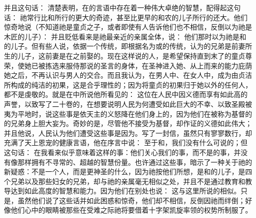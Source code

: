 并且这句话： 清楚表明，在的言语中存在着一种伟大卓绝的智慧，配得起这句话： 祂常行比和所行的更大的奇迹，甚至比更早的和农的儿子所行的还大。他们惊奇地说（不知道祂是童贞之子，或者即使有人告诉他们也不相信，反倒以为祂是木匠的儿子）： 并且贬低看来是祂最亲近的亲属全体，说： 他们那时以为祂是和的儿子。但有些人说，依据一个传统，即根据名为或的传统，认为的兄弟是前妻所生的儿子，这前妻是在之前娶的。现在这样说的人，是希望保持直到末了的童贞尊荣，使她已被拣选来服侍那说的圣言的身体，在圣神进入她、从上而来的能力庇荫她之后，不再认识与男人的交合。而且我认为，在男人中、在女人中，成为由贞洁所构成的纯洁的初果，这是合乎理性的；因为将童贞的初果归于她以外的任何人，都不是虔敬的。就是在中所说他所看见的： 这位在人民中因义德而享有如此高的声誉，以致写了二十卷的，在想要说明人民为何遭受如此巨大的不幸、以致圣殿被夷为平地时，说这些事是依天主的义怒降在他们身上的，因为他们在被称为基督的的兄弟身上胆大妄为。奇妙的是，尽管他不接受为基督，却作证的义德如此伟大；并且他说，人民认为他们遭受这些事是因为。写了一封信，虽然只有寥寥数行，却充满了天上恩宠的健康言语，他在序言中说： 至于和，我们没有什么可说的；但这句话： 在我看来似乎意味着这样的事：他们关心我们的事，而不是的事，并没有像那样拥有不寻常的、超越的智慧份量。也许通过这些事，暗示了一种关于祂的新疑惑：不是一个人，而是更神圣的什么，因为祂按他们所想，是和的儿子，是四个兄弟以及那些妇女的兄弟，却与祂的亲属毫无相似之处，并且不是通过教育和教导达到如此高度的智慧和能力。因为他们在别处也说： 这与这里所说的相似。只是，虽然他们说了这些话并如此困惑和惊奇，他们却不相信，反倒因祂而绊倒；好像他们心中的眼睛被那些在受难之际祂将要借着十字架凯旋率领的权势所制服了。\par


